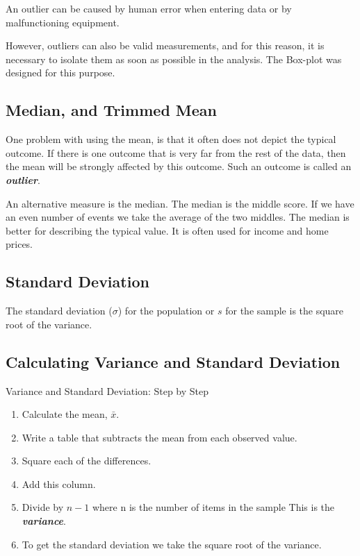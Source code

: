 \documentclass[12pt]{article}
\begin{document}
An outlier can be caused by human error when entering data or by malfunctioning equipment. 

However, outliers can also be valid measurements, and for this reason, it is necessary to isolate them as soon as possible in the analysis. The Box-plot was designed for this purpose.



\subsection{Median, and Trimmed Mean}

One problem with using the mean, is that it often does not depict the typical outcome.  If there is one outcome that is very far from the rest of the data, then the mean will be strongly affected by this outcome.  Such an outcome is called an \textbf{\textit{outlier}}.  

An alternative measure is the median.  The median is the middle score.  If we have an even number of events we take the average of the two middles.  The median is better for describing the typical value.  It is often used for income and home prices.


\subsection*{Standard Deviation}
The standard deviation ($\sigma$) for the population or $s$ for the sample is the square root of
the variance.

\subsection{Calculating Variance and Standard Deviation}

Variance and Standard Deviation: Step by Step
\begin{enumerate}
\item Calculate the mean, $\bar{x}$. 

\item Write a table that subtracts the mean from each observed value.

\item Square each of the differences.

\item Add this column.

\item Divide by $n-1$ where n is the number of items in the sample  This is the \textit{\textbf{variance}}.

\item To get the standard deviation we take the square root of the variance.  
\end{enumerate}
\end{document}
